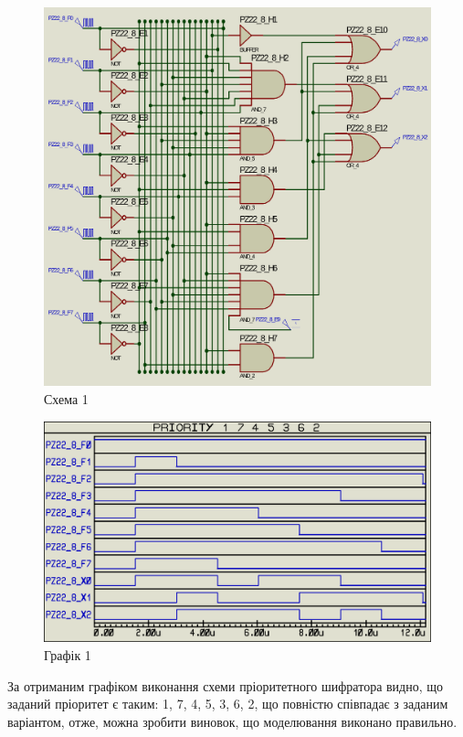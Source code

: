 \documentclass{article}
\begin{document}
\begin{normalsize}
	\begin{figure}[H]
		\centering
		\includegraphics[scale=0.25]{s1}	
		\caption{Схема 1}
	\end{figure}
	\begin{figure}[H]
		\centering
		\includegraphics[scale=0.34]{g1}	
		\caption{Графік 1}
	\end{figure}

	За отриманим графіком виконання схеми пріоритетного шифратора видно, що заданий пріоритет є таким: 1, 7, 4, 5, 3, 6, 2, що повністю співпадає з заданим варіантом, отже, можна зробити виновок, що моделювання виконано правильно.


\end{normalsize}
\end{document}

